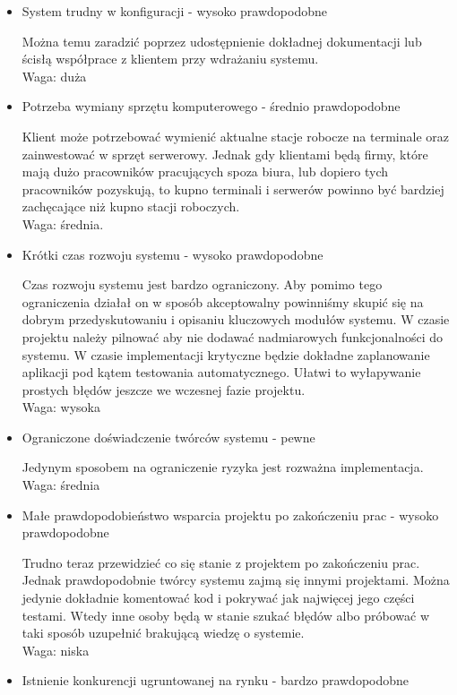 \documentclass[../wstep.tex]{subfiles}
\begin{document}
\begin{itemize}
    \item System trudny w konfiguracji - wysoko prawdopodobne

          Można temu zaradzić poprzez udostępnienie dokładnej dokumentacji lub ścisłą współprace z klientem przy wdrażaniu systemu. \\
          Waga: duża
    \item Potrzeba wymiany sprzętu komputerowego - średnio prawdopodobne

          Klient może potrzebować wymienić aktualne stacje robocze na terminale oraz zainwestować w sprzęt serwerowy. Jednak gdy klientami będą firmy, które mają dużo pracowników pracujących spoza biura, lub dopiero tych pracowników pozyskują, to kupno terminali i serwerów powinno być bardziej zachęcające niż kupno stacji roboczych.\\
          Waga: średnia.
    \item Krótki czas rozwoju systemu - wysoko prawdopodobne

          Czas rozwoju systemu jest bardzo ograniczony. Aby pomimo tego ograniczenia działał on w sposób akceptowalny powinniśmy skupić się na dobrym przedyskutowaniu i opisaniu kluczowych modułów systemu. W czasie projektu należy pilnować aby nie dodawać nadmiarowych funkcjonalności do systemu. W czasie implementacji krytyczne będzie dokładne zaplanowanie aplikacji pod kątem testowania automatycznego. Ułatwi to wyłapywanie prostych błędów jeszcze we wczesnej fazie projektu.\\
          Waga: wysoka
    \item Ograniczone doświadczenie twórców systemu - pewne

          Jedynym sposobem na ograniczenie ryzyka jest rozważna implementacja.\\
          Waga: średnia
    \item Małe prawdopodobieństwo wsparcia projektu po zakończeniu prac - wysoko prawdopodobne

          Trudno teraz przewidzieć co się stanie z projektem po zakończeniu prac. Jednak prawdopodobnie twórcy systemu zajmą się innymi projektami. Można jedynie dokładnie komentować kod i pokrywać jak najwięcej jego części testami. Wtedy inne osoby będą w stanie szukać błędów albo próbować w taki sposób uzupełnić brakującą wiedzę o systemie.\\
          Waga: niska
    \item Istnienie konkurencji ugruntowanej na rynku - bardzo prawdopodobne


\end{itemize}
\end{document}
